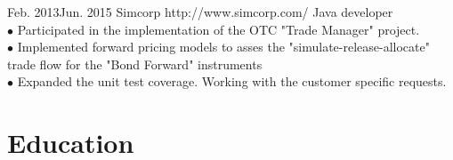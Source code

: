 \documentclass[10pt]{article} %
\begin{document}
\job
{Feb. 2013}{Jun. 2015}
{Simcorp}
{http://www.simcorp.com/}
{Java developer}
{
\textbf{}  
\\$\bullet$ Participated in the implementation of the OTC "Trade Manager" project. 
\\$\bullet$ Implemented forward pricing models to asses the "simulate-release-allocate" trade flow for the "Bond Forward" instruments
\\$\bullet$ Expanded the unit test coverage. Working with the customer specific requests. \\
 }


\section{Education}

\end{document}
